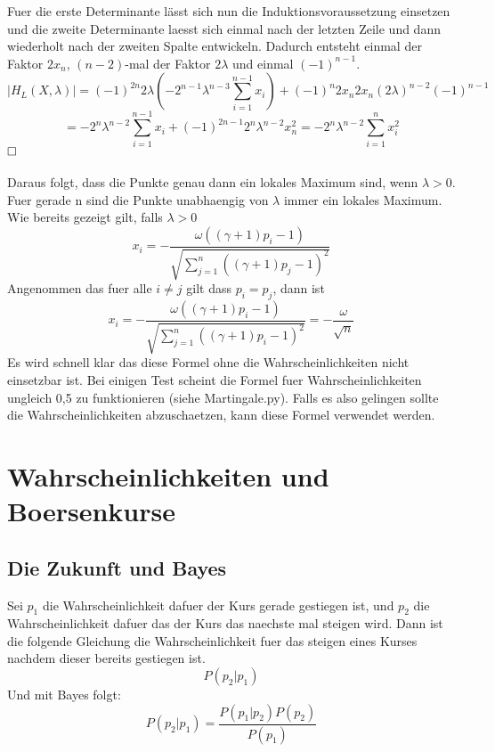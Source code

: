 \documentclass[11pt]{scrartcl}
\begin{document}
			Fuer die erste Determinante lässt sich nun die Induktionsvoraussetzung einsetzen und die zweite Determinante laesst sich einmal nach der letzten Zeile und dann wiederholt nach der zweiten Spalte entwickeln. Dadurch entsteht einmal der Faktor \(2x_{n}\), \((n-2)\)-mal der Faktor \(2\lambda\) und einmal \((-1)^{n-1}\).
			\begin{equation}
			|H_{L}(X,\lambda)|=(-1)^{2n}2\lambda(-2^{n-1}\lambda^{n-3}\sum_{i=1}^{n-1}x_{i})+(-1)^{n}2x_{n}2x_{n}(2\lambda)^{n-2}(-1)^{n-1}
			\end{equation}
			\begin{equation}
			=-2^{n}\lambda^{n-2}\sum_{i=1}^{n-1}x_{i}+(-1)^{2n-1}2^{n}\lambda^{n-2}x_{n}^{2}
			=-2^n\lambda^{n-2}\sum_{i=1}^{n}x_{i}^2
			\end{equation}
			$\hfill\square$\\\\
			Daraus folgt, dass die Punkte genau dann ein lokales Maximum sind, wenn \(\lambda>0\). Fuer gerade n sind die Punkte unabhaengig von \(\lambda\) immer ein lokales Maximum. Wie bereits gezeigt gilt, falls \(\lambda>0\)
			\begin{equation}
			x_{i}=-\frac{\omega((\gamma +1)p_{i}-1)}{\sqrt{\sum_{j=1}^{n}((\gamma +1)p_{j}-1)^2}}
			\end{equation}
			Angenommen das fuer alle \(i\neq j\) gilt dass \(p_{i}=p_{j}\), dann ist
			\begin{equation}
			x_{i}=-\frac{\omega((\gamma +1)p_{i}-1)}{\sqrt{\sum_{j=1}^{n}((\gamma +1)p_{i}-1)^2}}
			=-\frac{\omega}{\sqrt{n}}
			\end{equation}
			Es wird schnell klar das diese Formel ohne die Wahrscheinlichkeiten nicht einsetzbar ist. Bei einigen Test scheint die Formel fuer Wahrscheinlichkeiten ungleich 0,5 zu funktionieren (siehe Martingale.py).
			Falls es also gelingen sollte die Wahrscheinlichkeiten abzuschaetzen, kann diese Formel verwendet werden.
			
	\section{Wahrscheinlichkeiten und Boersenkurse}
		\subsection{Die Zukunft und Bayes}
			Sei \(p_{1}\) die Wahrscheinlichkeit dafuer der Kurs gerade gestiegen ist, und \(p_{2}\) die Wahrscheinlichkeit dafuer das der Kurs das naechste mal steigen wird.
			Dann ist die folgende Gleichung die Wahrscheinlichkeit fuer das steigen eines Kurses nachdem dieser bereits gestiegen ist.
			\begin{equation}
				P(p_{2}\vert p_{1})
			\end{equation}
			Und mit Bayes folgt:
			\begin{equation}
			P(p_{2}\vert p_{1})=\frac{P(p_{1}\vert p_{2})P(p_{2})}{P(p_{1})}
			\end{equation}
\end{document}
